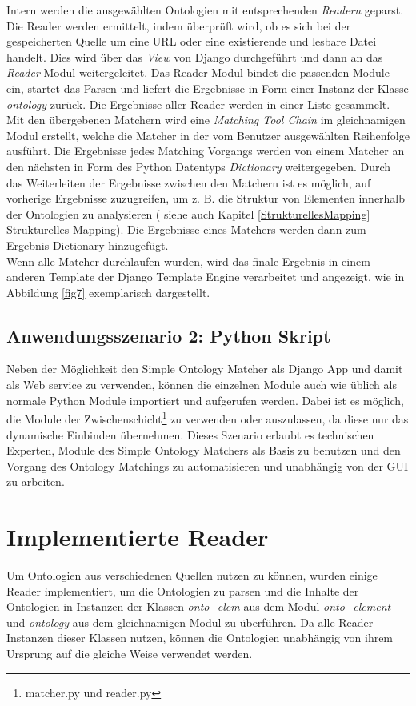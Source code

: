 		Intern werden die ausgewählten Ontologien mit entsprechenden
		\textit{Readern} geparst. Die Reader werden ermittelt, indem überprüft wird,
		ob es sich bei der gespeicherten Quelle um eine URL oder eine
		existierende und lesbare Datei handelt. Dies wird über das \textit{View} von
		Django durchgeführt und dann an das \textit{Reader} Modul weitergeleitet. Das
		Reader Modul bindet die passenden Module ein, startet das Parsen und liefert
		die Ergebnisse in Form einer Instanz der Klasse \textit{ontology} zurück. Die Ergebnisse
		aller Reader werden in einer Liste gesammelt.\\
		Mit den übergebenen Matchern wird eine \textit{Matching Tool Chain} im
		gleichnamigen Modul erstellt, welche die Matcher in der vom
		Benutzer ausgewählten Reihenfolge ausführt. Die Ergebnisse jedes Matching
		Vorgangs werden von einem Matcher an den nächsten in Form des Python Datentyps \textit{Dictionary}
		weitergegeben. Durch das Weiterleiten der Ergebnisse zwischen den Matchern
		ist es möglich, auf vorherige Ergebnisse zuzugreifen, um z. B. die Struktur von
		Elementen innerhalb der Ontologien zu analysieren ( siehe auch Kapitel
		\ref{StrukturellesMapping} Strukturelles Mapping).
		Die Ergebnisse eines Matchers werden dann zum Ergebnis Dictionary
		hinzugefügt.\\
		Wenn alle Matcher durchlaufen wurden, wird das finale Ergebnis in einem
		anderen Template der Django Template Engine verarbeitet und angezeigt,
		wie in Abbildung \ref{fig7} exemplarisch dargestellt.
		
		\subsection{Anwendungsszenario 2: Python Skript}
		Neben der Möglichkeit den Simple Ontology Matcher als Django App und damit als
		Web service zu verwenden, können die einzelnen Module auch wie üblich als
		normale Python Module importiert und aufgerufen werden. Dabei ist es möglich, die Module der
		Zwischenschicht\footnote{matcher.py und reader.py} zu verwenden oder
		auszulassen, da diese nur das dynamische Einbinden übernehmen. Dieses
		Szenario erlaubt es technischen Experten, Module des Simple Ontology Matchers
		als Basis zu benutzen und den Vorgang des Ontology Matchings zu
		automatisieren und unabhängig von der GUI zu arbeiten.
		
		\section{Implementierte Reader}
		Um Ontologien aus verschiedenen Quellen nutzen zu können, wurden einige Reader
		implementiert, um die Ontologien zu parsen und die Inhalte der Ontologien in
		Instanzen der Klassen \textit{onto\_elem} aus dem Modul \textit{onto\_element}
		und \textit{ontology} aus dem gleichnamigen Modul zu überführen. Da alle
		Reader Instanzen dieser Klassen nutzen, können die Ontologien unabhängig von
		ihrem Ursprung auf die gleiche Weise verwendet werden.
		

